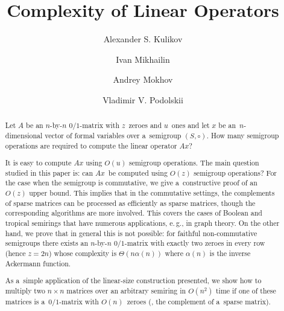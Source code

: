 \documentclass{toc}
\begin{document}
\begin{frontmatter}%

%
%
%

%
%
%
%
%
%
%
%
%
%
%
%
%
%
%
%
%

\title{Complexity of Linear Operators}

%
%
%
%

%

\author[kulikov]{Alexander S. Kulikov}
\author[mikhailin]{Ivan Mikhailin}
\author[mokhov]{Andrey Mokhov}
\author[podolskii]{Vladimir V. Podolskii}

%
%
%
%
%
%
\begin{abstract}
  Let %
  $A$ be an $n$-by-$n$ $0/1$-matrix  %
  with $z$~zeroes and $u$~ones and
  let %
  $x$ be an~$n$-dimensional vector of formal variables over a~semigroup
    $(S, \circ)$. How many semigroup operations are required to compute the
    linear operator $Ax$?

    It is easy to compute $Ax$ using $O(u)$ semigroup operations. The main
    question studied in this paper is: can $Ax$~be computed using $O(z)$
    semigroup operations?
	For the case when the semigroup is commutative, we give a~constructive proof
	of an~$O(z)$ upper bound. This implies that in
        the %
        commutative settings,
	the %
	complements of sparse matrices can be processed as efficiently as sparse
	matrices, though the corresponding algorithms are more involved. This covers
	the cases of Boolean and tropical semirings that have numerous applications,
	e.\,g., in graph theory.
    On the other hand, we prove that in general this is not possible: for
	faithful non-commutative semigroups there
    exists %
    an $n$-by-$n$ $0/1$-matrix  %
    with exactly two zeroes in
    every row (hence $z=2n$) whose complexity is $\Theta(n\alpha(n))$ where
    $\alpha(n)$ is the inverse Ackermann function.

    As a~simple application of the
    linear-size construction presented,  %
    we show
    how to multiply two $n\times n$ matrices over an arbitrary semiring in
    $O(n^2)$ time if one of these matrices is a~$0/1$-matrix with $O(n)$~zeroes
    (\ie, %
    the complement  %
    of a~sparse matrix).
\end{abstract}

%

\end{frontmatter}
\end{document}

